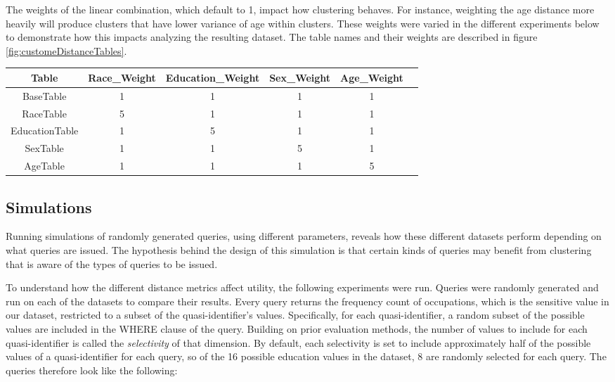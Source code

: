 The weights of the linear combination, which default to 1, impact how clustering behaves. For instance, weighting the age distance more heavily will produce clusters that have lower variance of age within clusters. These weights were varied in the different experiments below to demonstrate how this impacts analyzing the resulting dataset. The table names and their weights are described in figure \ref{fig:customeDistanceTables}.

\begin{figure*}
\centering
\begin{tabular}{|c||c|c|c|c|c|}
\hline
Table & Race\_Weight & Education\_Weight & Sex\_Weight & Age\_Weight \\
\hline
\hline
BaseTable & 1 & 1 & 1 & 1 \\
\hline
RaceTable & 5 & 1 & 1 & 1  \\
\hline
EducationTable & 1 & 5 & 1 & 1  \\
\hline
SexTable & 1 & 1 & 5 & 1  \\
\hline
AgeTable & 1 & 1 & 1 & 5  \\
\hline
\end{tabular}
\caption{Custom Distance Tables}
\label{fig:customeDistanceTables}
\end{figure*}


\subsection{Simulations}
Running simulations of randomly generated queries, using different parameters, reveals how these different datasets perform depending on what queries are issued. The hypothesis behind the design of this simulation is that certain kinds of queries may benefit from clustering that is aware of the types of queries to be issued.

To understand how the different distance metrics affect utility, the following experiments were run. Queries were randomly generated and run on each of the datasets to compare their results. Every query returns the frequency count of occupations, which is the sensitive value in our dataset, restricted to a subset of the quasi-identifier's values. Specifically, for each quasi-identifier, a random subset of the possible values are included in the WHERE clause of the query. Building on prior evaluation methods\cite{xiaoAnatomy}, the number of values to include for each quasi-identifier is called the \emph{selectivity} of that dimension. By default, each selectivity is set to include approximately half of the possible values of a quasi-identifier for each query, so of the 16 possible education values in the dataset, 8 are randomly selected for each query. The queries therefore look like the following:

